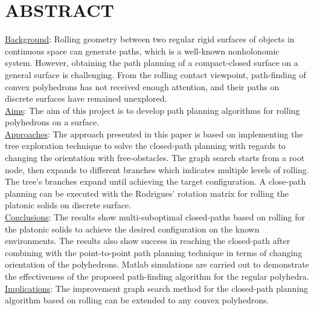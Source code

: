 
\noindent\section{ABSTRACT}
\noindent \uline{Background}: 
Rolling geometry between two regular rigid surfaces of objects in continuous space can generate paths, which is a well-known nonholonomic system. However, obtaining the path planning of a compact-closed surface on a general surface is challenging. From the rolling contact viewpoint, path-finding of convex polyhedrons has not received enough attention, and their paths on discrete surfaces have remained unexplored. \\
\noindent \uline{Aims}: The aim of this project is to develop path planning algorithms for rolling polyhedrons on a surface.\\
%
\noindent \uline{Approaches}: 
The approach presented in this paper is based on implementing the tree exploration technique to solve the closed-path planning with regards to changing the orientation with free-obstacles. 
The graph search starts from a root node, then expands to different branches which indicates multiple levels of rolling. 
The tree's branches expand until achieving the target configuration. 
A close-path planning can be executed with the Rodrigues' rotation matrix for rolling the platonic solids on discrete surface.\\
%
\noindent \uline{Conclusions}: 
The results show multi-suboptimal closed-paths based on rolling for the platonic solids to achieve the desired configuration on the known environments. 
The results also show success in reaching the closed-path after combining with the point-to-point path planning technique in terms of changing orientation of the polyhedrons.
Matlab simulations are carried out to demonstrate the effectiveness of the proposed path-finding algorithm for the regular polyhedra. \\ 
%
\noindent \uline{Implications}: 
The improvement graph search method for the closed-path planning algorithm based on rolling can be extended to any convex polyhedrons.




